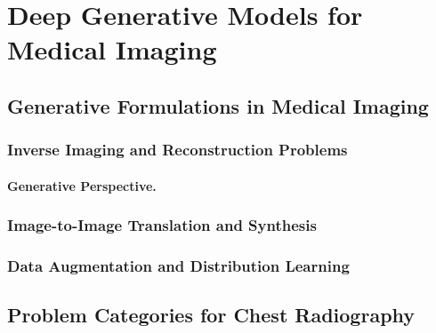 \section{Deep Generative Models for Medical Imaging}
\label{sec:medical_imaging_context}

\subsection{Generative Formulations in Medical Imaging}

\subsubsection{Inverse Imaging and Reconstruction Problems}

\paragraph{Generative Perspective.}

\subsubsection{Image-to-Image Translation and Synthesis}

\subsubsection{Data Augmentation and Distribution Learning}

\subsection{Problem Categories for Chest Radiography}
